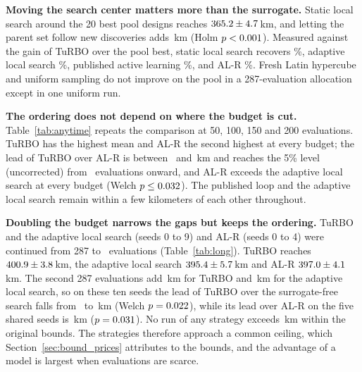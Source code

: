 \textbf{Moving the search center matters more than the surrogate.} Static local search around the 20 best pool designs reaches $365.2 \pm 4.7$\,km, and letting the parent set follow new discoveries adds \NvDAdaptvLocTen\,km (Holm $p < 0.001$). Measured against the gain of TuRBO over the pool best, static local search recovers \NvShareLocTen\%, adaptive local search \NvShareAdapt\%, published active learning \NvShareAL\%, and AL-R \NvShareALR\%. Fresh Latin hypercube and uniform sampling do not improve on the pool in a 287-evaluation allocation except in one uniform run.

\textbf{The ordering does not depend on where the budget is cut.} Table~\ref{tab:anytime} repeats the comparison at 50, 100, 150 and 200 evaluations. TuRBO has the highest mean and AL-R the second highest at every budget; the lead of TuRBO over AL-R is between \NlAnyTRlo\ and \NlAnyTRhi\,km and reaches the 5\% level (uncorrected) from \NlAnyTRsigFrom\ evaluations onward, and AL-R exceeds the adaptive local search at every budget (Welch $p \le 0.032$). The published loop and the adaptive local search remain within a few kilometers of each other throughout.

\textbf{Doubling the budget narrows the gaps but keeps the ordering.} TuRBO and the adaptive local search (seeds 0 to 9) and AL-R (seeds 0 to 4) were continued from 287 to \NlBudget\ evaluations (Table~\ref{tab:long}). TuRBO reaches $400.9 \pm 3.8$\,km, the adaptive local search $395.4 \pm 5.7$\,km and AL-R $397.0 \pm 4.1$\,km. The second 287 evaluations add \NlTurboGain\,km for TuRBO and \NlAdaptGain\,km for the adaptive local search, so on these ten seeds the lead of TuRBO over the surrogate-free search falls from \NlTvAAD\ to \NlTvACD\,km (Welch $p = 0.022$), while its lead over AL-R on the five shared seeds is \NlTvRCD\,km ($p = 0.031$). No run of any strategy exceeds \NlAllMax\,km within the original bounds. The strategies therefore approach a common ceiling, which Section~\ref{sec:bound_prices} attributes to the bounds, and the advantage of a model is largest when evaluations are scarce.

\begin{table}[htbp]
\centering\small
\caption{Best feasible range (km, mean $\pm$ standard deviation, pool included) when the runs are continued to twice the budget, and differences between strategies with two-sided Welch $p$-values (not corrected for multiplicity).}
\label{tab:long}

\end{table}

